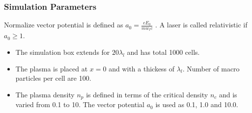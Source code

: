 \documentclass{beamer}
\begin{document}
{\begin{frame}
\end{frame}
\begin{frame}
    \small
    \frametitle{Simulation Parameters}
    Normalize vector potential is defined as
    $
        a_0 = \frac{eE_0}{m w_l c}
    $
    . A laser is called relativistic if $a_0 \ge 1$.
    \begin{itemize}
        \item The simulation box extends for $20 \lambda _l$ and has total 1000 cells.
        \item  The plasma is placed at $x=0$ and with a thickess of $\lambda_l$.  Number of macro particles per cell are 100.
        \item The plasma density $n_p$ is defined in terms of the critical density $n_c$ and is varied from 0.1 to 10. The vector potential $a_0$ is used as 0.1, 1.0 and 10.0.
    \end{itemize}


\end{frame}}
\end{document}
